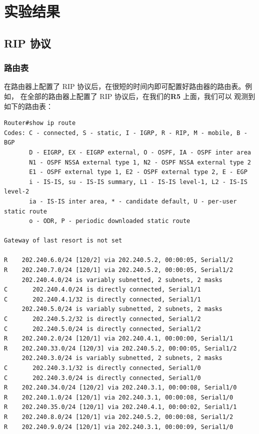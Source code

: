 \documentclass[black,normal,cn]{elegantnote}
\begin{document}
\section{实验结果}
\subsection{RIP 协议}
\subsubsection{路由表}
在路由器上配置了 RIP 协议后，在很短的时间内即可配置好路由器的路由表。例如，
在全部的路由器上配置了 RIP 协议后，在我们的\textbf{R5} 上面，我们可以
观测到如下的路由表：
\begin{lstlisting}
Router#show ip route
Codes: C - connected, S - static, I - IGRP, R - RIP, M - mobile, B - BGP
       D - EIGRP, EX - EIGRP external, O - OSPF, IA - OSPF inter area
       N1 - OSPF NSSA external type 1, N2 - OSPF NSSA external type 2
       E1 - OSPF external type 1, E2 - OSPF external type 2, E - EGP
       i - IS-IS, su - IS-IS summary, L1 - IS-IS level-1, L2 - IS-IS level-2
       ia - IS-IS inter area, * - candidate default, U - per-user static route
       o - ODR, P - periodic downloaded static route

Gateway of last resort is not set

R    202.240.6.0/24 [120/2] via 202.240.5.2, 00:00:05, Serial1/2
R    202.240.7.0/24 [120/1] via 202.240.5.2, 00:00:05, Serial1/2
     202.240.4.0/24 is variably subnetted, 2 subnets, 2 masks
C       202.240.4.0/24 is directly connected, Serial1/1
C       202.240.4.1/32 is directly connected, Serial1/1
     202.240.5.0/24 is variably subnetted, 2 subnets, 2 masks
C       202.240.5.2/32 is directly connected, Serial1/2
C       202.240.5.0/24 is directly connected, Serial1/2
R    202.240.2.0/24 [120/1] via 202.240.4.1, 00:00:00, Serial1/1
R    202.240.33.0/24 [120/3] via 202.240.5.2, 00:00:05, Serial1/2
     202.240.3.0/24 is variably subnetted, 2 subnets, 2 masks
C       202.240.3.1/32 is directly connected, Serial1/0
C       202.240.3.0/24 is directly connected, Serial1/0
R    202.240.34.0/24 [120/2] via 202.240.3.1, 00:00:08, Serial1/0
R    202.240.1.0/24 [120/1] via 202.240.3.1, 00:00:08, Serial1/0
R    202.240.35.0/24 [120/1] via 202.240.4.1, 00:00:02, Serial1/1
R    202.240.8.0/24 [120/1] via 202.240.5.2, 00:00:08, Serial1/2
R    202.240.9.0/24 [120/1] via 202.240.3.1, 00:00:09, Serial1/0
\end{lstlisting}
\end{document}

